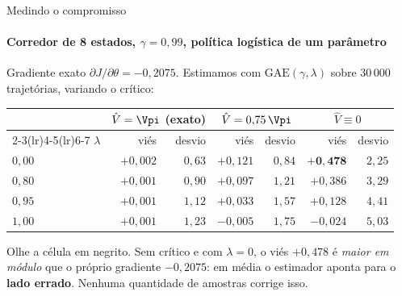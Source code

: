 \documentclass[aspectratio=169, 10pt]{beamer}
\newcommand{\thv}{\theta}
\newcommand{\Vhat}{\hat{V}}
\begin{document}
\begin{frame}{Medindo o compromisso}
  \framesubtitle{Corredor de 8 estados, $\gamma = 0{,}99$, política logística de um parâmetro}

  Gradiente exato $\partial J/\partial\thv = -0{,}2075$. Estimamos com
  $\mathrm{GAE}(\gamma,\lambda)$ sobre $30\,000$ trajetórias, variando o crítico:

  \begin{center}\small
  \begin{tabular}{@{}lrrrrrr@{}}
    \toprule
    & \multicolumn{2}{c}{$\Vhat = \Vpi$ (exato)}
    & \multicolumn{2}{c}{$\Vhat = 0{,}75\,\Vpi$}
    & \multicolumn{2}{c}{$\Vhat \equiv 0$}\\
    \cmidrule(lr){2-3}\cmidrule(lr){4-5}\cmidrule(lr){6-7}
    $\lambda$ & viés & desvio & viés & desvio & viés & desvio\\
    \midrule
    $0{,}00$ & $+0{,}002$ & $0{,}63$ & $+0{,}121$ & $0{,}84$ & $\mathbf{+0{,}478}$ & $2{,}25$\\
    $0{,}80$ & $+0{,}001$ & $0{,}90$ & $+0{,}097$ & $1{,}21$ & $+0{,}386$ & $3{,}29$\\
    $0{,}95$ & $+0{,}001$ & $1{,}12$ & $+0{,}033$ & $1{,}57$ & $+0{,}128$ & $4{,}41$\\
    $1{,}00$ & $+0{,}001$ & $1{,}23$ & $-0{,}005$ & $1{,}75$ & $-0{,}024$ & $5{,}03$\\
    \bottomrule
  \end{tabular}
  \end{center}

  \begin{alertabox}
    Olhe a célula em negrito. Sem crítico e com $\lambda=0$, o viés $+0{,}478$ é
    \emph{maior em módulo} que o próprio gradiente $-0{,}2075$: em média o estimador
    aponta para o \textbf{lado errado}. Nenhuma quantidade de amostras corrige isso.
  \end{alertabox}
\end{frame}
\end{document}
